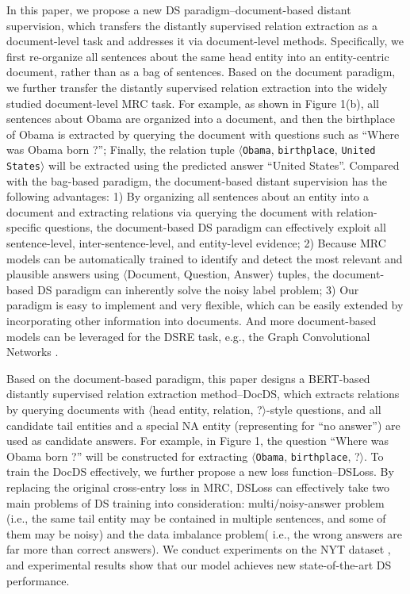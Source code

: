\documentclass[11pt,a4paper]{article}
\begin{document}
  In this paper, we propose a new DS paradigm--document-based distant supervision, which transfers the distantly supervised relation extraction as a document-level task and addresses it via document-level methods.
  Specifically, we first re-organize all sentences about the same head entity into an entity-centric document, rather than as a bag of sentences.
  Based on the document paradigm, we further transfer the distantly supervised relation extraction into the widely studied document-level MRC task.
  For example, as shown in Figure 1(b), all sentences about Obama are organized into a document, and then the birthplace of Obama is extracted by querying the document with questions such as ``Where was Obama born ?'';
  Finally, the relation tuple $\langle$\texttt{Obama}, \texttt{birthplace}, \texttt{United States}$\rangle$ will be extracted using the predicted answer ``United States''.
  Compared with the bag-based paradigm, the document-based distant supervision has the following advantages:
  1) By organizing all sentences about an entity into a document and extracting relations via querying the document with relation-specific questions, the document-based DS paradigm can effectively exploit all sentence-level, inter-sentence-level, and entity-level evidence;
  2) Because MRC models can be automatically trained to identify and detect the most relevant and plausible answers using $\langle$Document, Question, Answer$\rangle$ tuples, the document-based DS paradigm can inherently solve the noisy label problem;
  3) Our paradigm is easy to implement and very flexible, which can be easily extended by incorporating other information into documents. And more document-based models can be leveraged for the DSRE task, e.g., the Graph Convolutional Networks \cite{kipf_semi-supervised_2017}.
  
  Based on the document-based paradigm, this paper designs a BERT-based \cite{devlin_bert_2019} distantly supervised relation extraction method--DocDS, which extracts relations by querying documents with $\langle$head entity, relation, ?$\rangle$-style questions, and all candidate tail entities and a special NA entity (representing for ``no answer'') are used as candidate answers.
  For example, in Figure 1, the question ``Where was Obama born ?'' will be constructed for extracting $\langle$\texttt{Obama}, \texttt{birthplace}, ?$\rangle$.
  To train the DocDS effectively, we further propose a new loss function--DSLoss.
  By replacing the original cross-entry loss in MRC, DSLoss can effectively take two main problems of DS training into consideration: multi/noisy-answer problem (i.e., the same tail entity may be contained in multiple sentences, and some of them may be noisy) and the data imbalance problem( i.e., the wrong answers are far more than correct answers).
  We conduct experiments on the NYT dataset \cite{riedel_modeling_2010}, and experimental results show that our model achieves new state-of-the-art DS performance.
  
\end{document}
